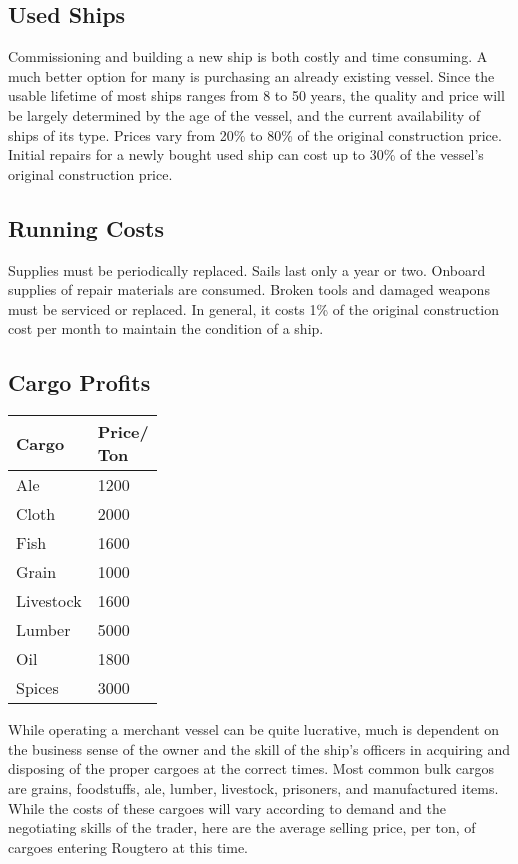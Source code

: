 \subsection{Used Ships}
Commissioning and building a new ship is both costly and time consuming. A much better option for many is purchasing an already existing vessel. Since the usable lifetime of most ships ranges from 8 to 50 years, the quality and price will be largely determined by the age of the vessel, and the current availability of ships of its type. Prices vary from 20\% to 80\% of the original construction price. Initial repairs for a newly bought used ship can cost up to 30\% of the vessel's original construction price.
\subsection{Running Costs}
Supplies must be periodically replaced. Sails last only a year or two. Onboard supplies of repair materials are consumed. Broken tools and damaged weapons must be serviced or replaced. In general, it costs 1\% of the original construction cost per month to maintain the condition of a ship.
\subsection{Cargo Profits}

\begin{normbox}
\small
\begin{tabular}{@{} l l}
Cargo & \makecell{Price/\\Ton}\\
\midrule
Ale & 1200\\
Cloth & 2000\\
Fish & 1600\\
Grain & 1000\\
Livestock & 1600\\
Lumber & 5000\\
Oil & 1800\\
Spices & 3000\\
\end{tabular}
\end{normbox}

While operating a merchant vessel can be quite lucrative, much is dependent on the business sense of the owner and the skill of the ship's officers in acquiring and disposing of the proper cargoes at the correct times. Most common bulk cargos are grains, foodstuffs, ale, lumber, livestock, prisoners, and manufactured items. While the costs of these cargoes will vary according to demand and the negotiating skills of the trader, here are the average selling price, per ton, of cargoes entering Rougtero at this time.

